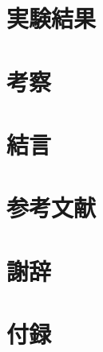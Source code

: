 \documentclass[a4j,12pt]{jsarticle}
\begin{document}
\section{実験結果}

\section{考察}

\section{結言}

\section{参考文献}

\section{謝辞}

\section{付録}
\end{document}
